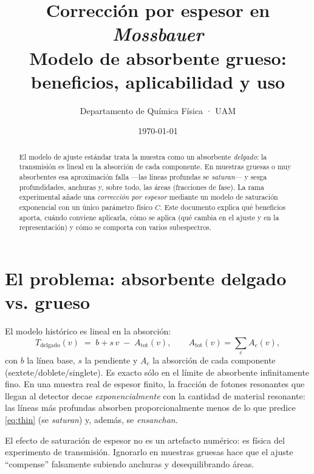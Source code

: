 \documentclass[11pt,a4paper]{article}
\title{\textbf{Corrección por espesor en \emph{Mossbauer}}\\[3pt]
\large Modelo de absorbente grueso: beneficios, aplicabilidad y uso}
\author{Departamento de Química Física · UAM}
\date{\today}
\begin{document}
\maketitle

\begin{abstract}\noindent
El modelo de ajuste estándar trata la muestra como un absorbente \emph{delgado}:
la transmisión es lineal en la absorción de cada componente. En muestras gruesas
o muy absorbentes esa aproximación falla —las líneas profundas se \emph{saturan}—
y sesga profundidades, anchuras y, sobre todo, las áreas (fracciones de fase).
La rama experimental añade una \emph{corrección por espesor} mediante un modelo de
saturación exponencial con un único parámetro físico $C$. Este documento explica
qué beneficios aporta, cuándo conviene aplicarla, cómo se aplica (qué cambia en el
ajuste y en la representación) y cómo se comporta con varios subespectros.
\end{abstract}

\tableofcontents
\bigskip

\section{El problema: absorbente delgado vs. grueso}

El modelo histórico es lineal en la absorción:
\begin{equation}
  T_{\text{delgado}}(v) \;=\; b + s\,v \;-\; A_{\text{tot}}(v),
  \qquad A_{\text{tot}}(v)=\sum_{c} A_c(v),
  \label{eq:thin}
\end{equation}
con $b$ la línea base, $s$ la pendiente y $A_c$ la absorción de cada componente
(sextete/doblete/singlete). Es exacto sólo en el límite de absorbente
infinitamente fino. En una muestra real de espesor finito, la fracción de fotones
resonantes que llegan al detector decae \emph{exponencialmente} con la cantidad de
material resonante: las líneas más profundas absorben proporcionalmente menos de
lo que predice \eqref{eq:thin} (se \emph{saturan}) y, además, se \emph{ensanchan}.

\begin{nota}
El efecto de saturación de espesor no es un artefacto numérico: es física del
experimento de transmisión. Ignorarlo en muestras gruesas hace que el ajuste
``compense'' falsamente subiendo anchuras y desequilibrando áreas.
\end{nota}

\end{document}
